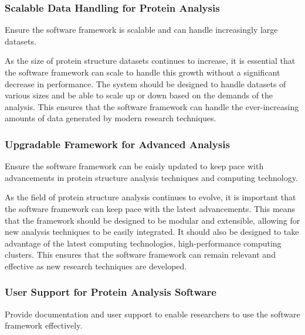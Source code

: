 \documentclass[]{final_report}
\begin{document}
\subsubsection{Scalable Data Handling for Protein Analysis}

\begin{displayquote}
    Ensure the software framework is scalable and can handle increasingly large datasets.
\end{displayquote}

As the size of protein structure datasets continues to increase, it is essential that the software framework can scale to handle this growth without a significant decrease in performance. The system should be designed to handle datasets of various sizes and be able to scale up or down based on the demands of the analysis. This ensures that the software framework can handle the ever-increasing amounts of data generated by modern research techniques.
\clearpage

\subsubsection{Upgradable Framework for Advanced Analysis}

\begin{displayquote}
    Ensure the software framework can be eaisly updated to keep pace with advancements in protein structure analysis techniques and computing technology.
\end{displayquote}

As the field of protein structure analysis continues to evolve, it is important that the software framework can keep pace with the latest advancements. This means that the framework should be designed to be modular and extensible, allowing for new analysis techniques to be easily integrated. It should also be designed to take advantage of the latest computing technologies, high-performance computing clusters. This ensures that the software framework can remain relevant and effective as new research techniques are developed.

\subsubsection{User Support for Protein Analysis Software}

\begin{displayquote}
    Provide documentation and user support to enable researchers to use the software framework effectively.
\end{displayquote}
\end{document}
